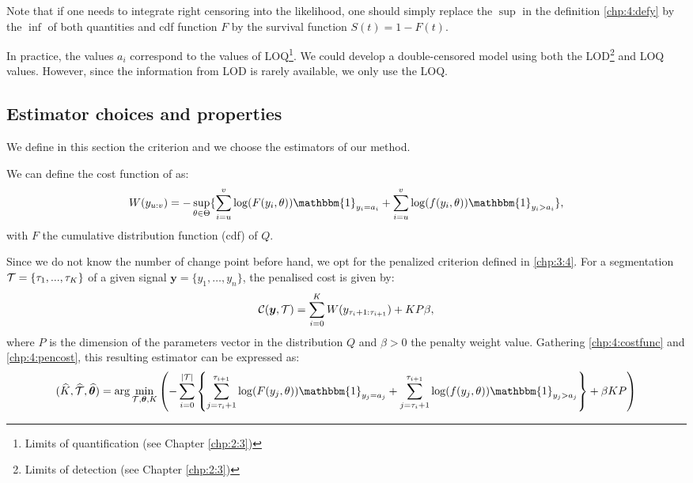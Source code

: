 Note that if one needs to integrate right censoring into the likelihood, one should simply replace the $\sup$ in the definition \ref{chp:4:defy} by the $\inf$ of both quantities and cdf function $F$ by the survival function $S(t)=1-F(t)$. 

In practice, the values $a_i$ correspond to the values of LOQ\footnote{Limits of quantification (see Chapter \ref{chp:2:3})}. We could develop a double-censored model using both the LOD\footnote{Limits of detection (see Chapter \ref{chp:2:3})} and LOQ values. However, since the information from LOD is rarely available, we only use the LOQ.

\subsection{Estimator choices and properties}

We define in this section the criterion and we choose the estimators of our method. 

We can define the cost function of  as:    
\begin{equation}\label{chp:4:costfunc}
W(y_{u:v}) = -\sup_{\theta\in\Theta}\{\sum_{i=u}^v\log(F(y_i,\theta))\mathbbm{1}_{y_i=a_i}+\sum_{i=u}^v\log(f(y_i,\theta))\mathbbm{1}_{y_i>a_i}\},
\end{equation}
with $F$ the cumulative distribution function (cdf) of $Q$.

Since we do not know the number of change point before hand, we opt for the penalized criterion defined in \ref{chp:3:4}. For a segmentation ${\mathcal T} = \{\tau_1,...,\tau_K\}$ of a given signal $\bm y =\{y_1,\dots,y_n\}$, the penalised cost is given by: 
\begin{equation}\label{chp:4:pencost}
{\mathcal C}(\bm y,{\mathcal T})=\sum_{i=0}^{K}  W(y_{\tau_i+1:\tau_{i+1}}) + KP\beta,
\end{equation}
where $P$ is the dimension of the parameters vector in the distribution $Q$ and $\beta > 0$ the penalty weight value. Gathering \eqref{chp:4:costfunc} and \eqref{chp:4:pencost}, this resulting estimator can be expressed as:  
\begin{equation}\label{chp:4:estim}
(\widehat{K},\widehat{\TT},\widehat{\bm \theta}) = \arg\min_{\TT,\bm \theta,K} \left(- \sum_{i=0}^{\lvert \TT \rvert}  \left\{\sum_{j=\tau_i+1}^{\tau_{i+1}}\log(F(y_j,\theta))\mathbbm{1}_{y_j=a_j}+\sum_{j=\tau_i+1}^{\tau_{i+1}}\log(f(y_j,\theta))\mathbbm{1}_{y_j>a_j}\right\}+\beta KP\right)
\end{equation}

